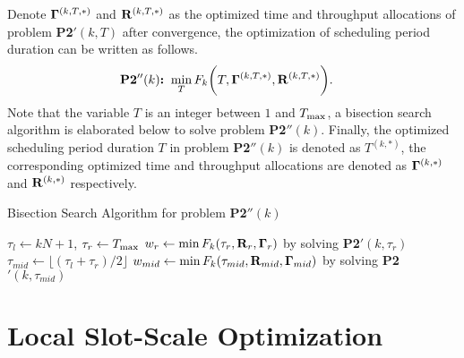 Denote ${\mathbf{\Gamma}^{(k,T,*)}}$ and ${\mathbf{R}^{(k,T,*)}}$ as the optimized time and throughput allocations of problem \textbf{P2$'(k,T)$} after convergence, the optimization of scheduling period duration can be written as follows.
\begin{align}
    \textbf{P2$''(k)$:~} & \min_{T} F_{k}  \bigg(T, {\mathbf{\Gamma}^{(k,T,*)}}, {\mathbf{R}^{(k,T,*)}} \bigg).
    \label{eqn:p2pp_k}
\end{align}
Note that the variable $T$ is an integer between $1$ and ${T_{\max}}$, a  bisection search algorithm is elaborated below to solve problem \textbf{P2$''(k)$}. Finally, the optimized scheduling period duration $T$ in problem \textbf{P2$''(k)$} is denoted as $T^{(k,*)}$, the corresponding optimized time and throughput allocations are denoted as $\mathbf{\Gamma}^{(k,*)}$ and  ${\mathbf{R}^{(k,*)}}$ respectively. 
\begin{algorithm}[ht]
    \caption{Bisection Search Algorithm for problem \textbf{P2$''(k)$}}\label{alg_bnb}
    \DontPrintSemicolon
    $\tau_{l} \gets kN+1$, $\tau_{r} \gets {T_{\max}}$\;
     $w_{r} \gets \min F_{k}( \tau_{r}, \mathbf{R}_{r}, \mathbf{\Gamma}_{r} )$ by solving \textbf{P2$'( k,\tau_{r} )$}\;
    {
        $\tau_{mid} \gets \lfloor{ (\tau_{l} + \tau_{r})/2 }\rfloor$\;
        $w_{mid} \gets \min F_{k}( \tau_{mid}, \mathbf{R}_{mid}, \mathbf{\Gamma}_{mid} )$ by solving \textbf{P2$'( k,\tau_{mid} )$}\;
    }
    \;
\end{algorithm}

\section{Local Slot-Scale Optimization}
\label{sec:local-policy}

